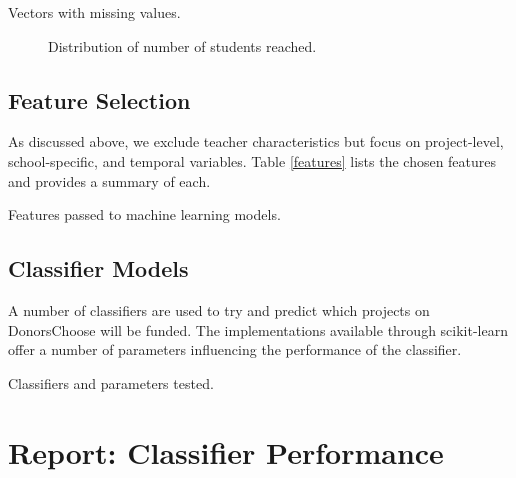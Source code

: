 \documentclass[11pt]{article}
\begin{document}
\begin{minipage}[c]{0.3\pagewidth}
\vspace{0pt}
\begin{table}[H]
\centering \small \renewcommand{\arraystretch}{1.1}

\caption{Vectors with missing values.}\label{missing}
\end{table}
\end{minipage} \hfill \begin{minipage}[c]{0.45\pagewidth}
\vspace{0pt}
\begin{figure}[H]
\centering

\caption{Distribution of number of students reached.} \label{sr_dist}
\end{figure}
\end{minipage}

\subsection{Feature Selection}
As discussed above, we exclude teacher characteristics but focus on project-level, school-specific, and temporal variables. Table \ref{features} lists the chosen features and provides a summary of each. 
\begin{table}[H]
\centering \small \renewcommand{\arraystretch}{1.1}

\caption{Features passed to machine learning models.}\label{features}
\end{table}

\subsection{Classifier Models}
A number of classifiers are used to try and predict which projects on DonorsChoose will be funded. The implementations available through scikit-learn offer a number of parameters influencing the performance of the classifier. 

\begin{table}[H]
\centering \small \renewcommand{\arraystretch}{1.1}

\caption{Classifiers and parameters tested.}\label{classifiers}
\end{table}


\section{Report: Classifier Performance}
\end{document}
